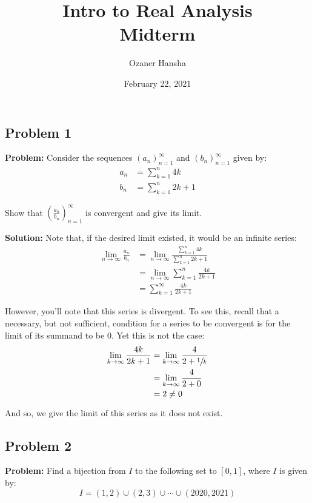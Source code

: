 \documentclass{article}
\begin{document}
\title{Intro to Real Analysis\\Midterm}
\author{Ozaner Hansha}
\date{February 22, 2021}
\maketitle

\subsection*{Problem 1}
\noindent\textbf{Problem:} Consider the sequences $(a_n)_{n=1}^\infty$ and $(b_n)_{n=1}^\infty$ given by:
\begin{align*}
  a_n&=\sum_{k=1}^n4k\\
  b_n&=\sum_{k=1}^n2k+1
\end{align*}

Show that $\left(\frac{a_n}{b_n}\right)_{n=1}^\infty$ is convergent and give its limit.
\bigskip

\noindent\textbf{Solution:} Note that, if the desired limit existed, it would be an infinite series:
\begin{align*}
  \lim_{n\to\infty}\frac{a_n}{b_n}&=\lim_{n\to\infty}\frac{\sum_{k=1}^n4k}{\sum_{k=1}^n 2k+1}\\
  &=\lim_{n\to\infty}\sum_{k=1}^n \frac{4k}{2k+1}\\
  &=\sum_{k=1}^\infty \frac{4k}{2k+1}\tag{def. of infinite series}
\end{align*}

However, you'll note that this series is divergent. To see this, recall that a necessary, but not sufficient, condition for a series to be convergent is for the limit of its summand to be 0. Yet this is not the case:
\begin{align*}
  \lim_{k\to\infty}\frac{4k}{2k+1}&=\lim_{k\to\infty}\frac{4}{2+\sfrac{1}{k}}\\
  &=\lim_{k\to\infty}\frac{4}{2+0}\\
  &=2\not=0
\end{align*}

And so, we  give the limit of this series as it does not exist.

\subsection*{Problem 2}
\noindent\textbf{Problem:} Find a bijection from $I$ to the following set to $[0,1]$, where $I$ is given by:
\begin{equation*}
  I=(1,2)\cup(2,3)\cup\cdots\cup(2020,2021)
\end{equation*}
\bigskip
\end{document}
